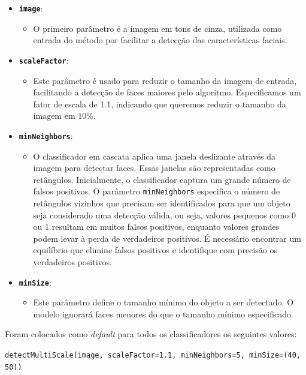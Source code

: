 \begin{itemize}
    \item \textbf{\texttt{image}}:
    \begin{itemize}
    \item O primeiro parâmetro é a imagem em tons de cinza, utilizada como entrada do método por facilitar a detecção das características faciais.
    \end{itemize}

\item \textbf{\texttt{scaleFactor}}:
\begin{itemize}
    \item Este parâmetro é usado para reduzir o tamanho da imagem de entrada, facilitando a detecção de faces maiores pelo algoritmo. Especificamos um fator de escala de 1.1, indicando que queremos reduzir o tamanho da imagem em 10\%.
    \end{itemize}

\item \textbf{\texttt{minNeighbors}}:
\begin{itemize}
    \item O classificador em cascata aplica uma janela deslizante através da imagem para detectar faces. Essas janelas são representadas como retângulos. Inicialmente, o classificador captura um grande número de falsos positivos. O parâmetro \texttt{minNeighbors} especifica o número de retângulos vizinhos que precisam ser identificados para que um objeto seja considerado uma detecção válida, ou seja, valores pequenos como 0 ou 1 resultam em muitos falsos positivos, enquanto valores grandes podem levar à perda de verdadeiros positivos. É necessário encontrar um equilíbrio que elimine falsos positivos e identifique com precisão os verdadeiros positivos.
\end{itemize}

\item \textbf{\texttt{minSize}}:
\begin{itemize}
    \item Este parâmetro define o tamanho mínimo do objeto a ser detectado. O modelo ignorará faces menores do que o tamanho mínimo especificado.
\end{itemize}

\end{itemize}

Foram colocados como \textit{default} para todos os classificadores os seguintes valores: 

{\small \texttt{detectMultiScale(image, scaleFactor=1.1, minNeighbors=5, minSize=(40, 50))}}

